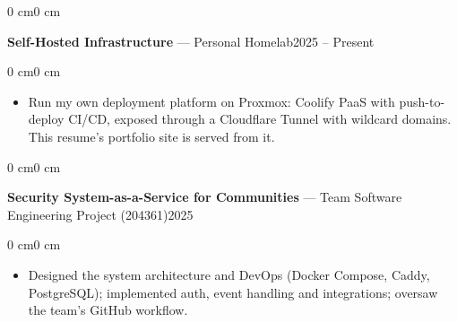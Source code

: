 \documentclass[10pt, letterpaper]{article}
\newenvironment{highlights}{
    \begin{itemize}[
        topsep=0.06 cm,
        parsep=0.06 cm,
        itemsep=0pt,
        leftmargin=0 cm + 10pt
    ]
}{
    \end{itemize}
}
\newenvironment{onecolentry}{
    \begin{adjustwidth}{0 cm}{0 cm}
}{
    \end{adjustwidth}
}
\newcommand{\datedentry}[2]{%
  \begin{onecolentry}
    \noindent #1\hfill #2%
  \end{onecolentry}
}
\begin{document}
\datedentry{\textbf{Self-Hosted Infrastructure} — Personal Homelab}{2025 -- Present}
\vspace{0.1 cm}
\begin{onecolentry}
    \begin{highlights}
        \item Run my own deployment platform on Proxmox: Coolify PaaS with push-to-deploy CI/CD, exposed through a Cloudflare Tunnel with wildcard domains. This resume's portfolio site is served from it.
    \end{highlights}
\end{onecolentry}

\vspace{0.12 cm}

\datedentry{\textbf{Security System-as-a-Service for Communities} — Team Software Engineering Project (204361)}{2025}
\vspace{0.1 cm}
\begin{onecolentry}
    \begin{highlights}
        \item Designed the system architecture and DevOps (Docker Compose, Caddy, PostgreSQL); implemented auth, event handling and integrations; oversaw the team's GitHub workflow.
    \end{highlights}
\end{onecolentry}
\end{document}
